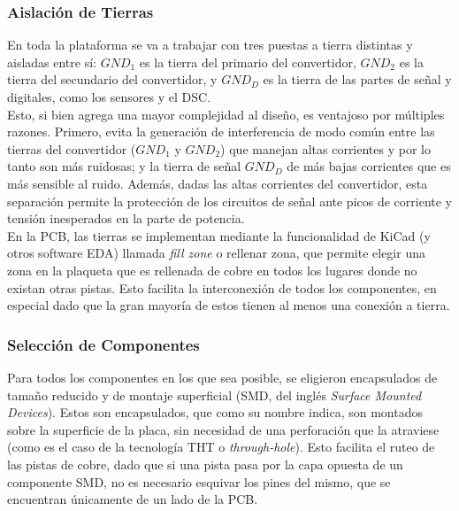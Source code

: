 \subsubsection{Aislación de Tierras}

En toda la plataforma se va a trabajar con tres puestas a tierra distintas y aisladas entre sí: $GND_1$ es la tierra del primario del convertidor, $GND_2$ es la tierra del secundario del convertidor, y $GND_D$ es la tierra de las partes de señal y digitales, como los sensores y el DSC.\\

Esto, si bien agrega una mayor complejidad al diseño, es ventajoso por múltiples razones. Primero, evita la generación de interferencia de modo común entre las tierras del convertidor ($GND_1$ y $GND_2$) que manejan altas corrientes y por lo tanto son más ruidosas; y la tierra de señal $GND_D$ de más bajas corrientes que es más sensible al ruido. Además, dadas las altas corrientes del convertidor, esta separación permite la protección de los circuitos de señal ante picos de corriente y tensión inesperados en la parte de potencia.\\

En la PCB, las tierras se implementan mediante la funcionalidad de KiCad (y otros software EDA) llamada \textit{fill zone} o rellenar zona, que permite elegir una zona en la plaqueta que es rellenada de cobre en todos los lugares donde no existan otras pistas. Esto facilita la interconexión de todos los componentes, en especial dado que la gran mayoría de estos tienen al menos una conexión a tierra.\\

\subsubsection{Selección de Componentes}

Para todos los componentes en los que sea posible, se eligieron encapsulados de tamaño reducido y de montaje superficial (SMD, del inglés \textit{Surface Mounted Devices}). Estos son encapsulados, que como su nombre indica, son montados sobre la superficie de la placa, sin necesidad de una perforación que la atraviese (como es el caso de la tecnología THT o \textit{through-hole}). Esto facilita el ruteo de las pistas de cobre, dado que si una pista pasa por la capa opuesta de un componente SMD, no es necesario esquivar los pines del mismo, que se encuentran únicamente de un lado de la PCB.\\


